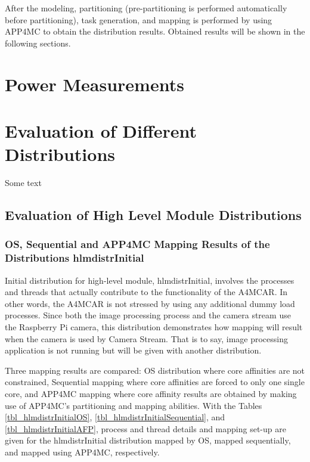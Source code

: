 After the modeling, partitioning (pre-partitioning is performed automatically before partitioning), task generation, and mapping is performed by using APP4MC to obtain the distribution results. Obtained results will be shown in the following sections.
\section{Power Measurements}


\section{Evaluation of Different Distributions}
Some text \\
\subsection{Evaluation of High Level Module Distributions}

\subsubsection{OS, Sequential and APP4MC Mapping Results of the Distributions hlmdistrInitial}

Initial distribution for high-level module, hlmdistrInitial, involves the processes and threads that actually contribute to the functionality of the A4MCAR. In other words, the A4MCAR is not stressed by using any additional dummy load processes. Since both the image processing process and the camera stream use the Raspberry Pi camera, this distribution demonstrates how mapping will result when the camera is used by Camera Stream. That is to say, image processing application is not running but will be given with another distribution. 

Three mapping results are compared: OS distribution where core affinities are not constrained, Sequential mapping where core affinities are forced to only one single core, and APP4MC mapping where core affinity results are obtained by making use of APP4MC's partitioning and mapping abilities. With the Tables \ref{tbl_hlmdistrInitialOS}, \ref{tbl_hlmdistrInitialSequential}, and \ref{tbl_hlmdistrInitialAFP}, process and thread details and mapping set-up are given for the hlmdistrInitial distribution mapped by OS, mapped sequentially, and mapped using APP4MC, respectively.

